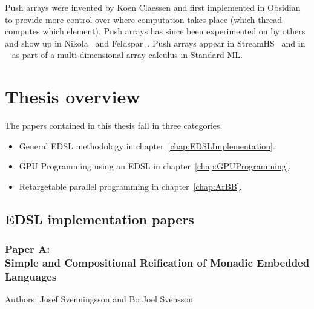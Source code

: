 \documentclass[a4paper]{book}
\newcommand{\paperA}{Paper A}
\newcommand{\paperATitle}{Simple and Compositional Reification of Monadic Embedded Languages}
\begin{document}
Push arrays were invented by Koen Claessen and first implemented in Obsidian 
to provide more control over where computation takes place (which thread computes 
which element). Push arrays has since been experimented on by others and show up 
in Nikola~\citet{NIKOLAPUSH} and Feldspar~\citet{FELDSPARPUSH}. Push arrays appear 
in StreamHS~\citet{FPCDSL} and in ~\citet{MOA} as part of a multi-dimensional array 
calculus in Standard ML. 


%
%
\section{Thesis overview} 


The papers contained in this thesis fall in three categories. 
\begin{itemize} 
\item General EDSL methodology in chapter~\ref{chap:EDSLImplementation}. 
\item GPU Programming using an EDSL in chapter~\ref{chap:GPUProgramming}. 
\item Retargetable parallel programming in chapter~\ref{chap:ArBB}. 
\end{itemize} 

\subsection{EDSL implementation papers} 

\subsubsection{\paperA: \\ \paperATitle} 

Authors: Josef Svenningsson and Bo Joel Svensson 

\vspace{5mm}
\end{document}
